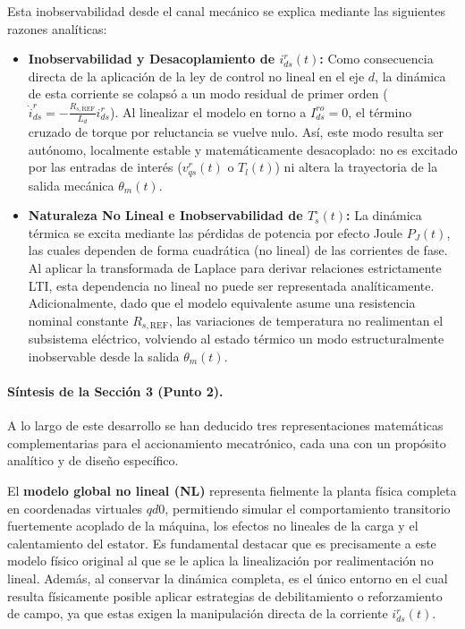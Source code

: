 \documentclass[10pt,a4paper]{article}
\begin{document}
Esta inobservabilidad desde el canal mecánico se explica mediante las siguientes razones analíticas:

\begin{itemize}
    \item \textbf{Inobservabilidad y Desacoplamiento de $i_{ds}^r(t)$:} Como consecuencia directa de la aplicación de la ley de control no lineal en el eje $d$, la dinámica de esta corriente se colapsó a un modo residual de primer orden ($\dot{i}_{ds}^r = -\frac{R_{s,\mathrm{REF}}}{L_d} i_{ds}^r$). Al linealizar el modelo en torno a $I_{ds}^{ro} = 0$, el término cruzado de torque por reluctancia se vuelve nulo. Así, este modo resulta ser autónomo, localmente estable y matemáticamente desacoplado: no es excitado por las entradas de interés ($v_{qs}^r(t)$ o $T_l(t)$) ni altera la trayectoria de la salida mecánica $\theta_m(t)$.
    \item \textbf{Naturaleza No Lineal e Inobservabilidad de $T_s^\circ(t)$:} La dinámica térmica se excita mediante las pérdidas de potencia por efecto Joule $P_J(t)$, las cuales dependen de forma cuadrática (no lineal) de las corrientes de fase. Al aplicar la transformada de Laplace para derivar relaciones estrictamente LTI, esta dependencia no lineal no puede ser representada analíticamente. Adicionalmente, dado que el modelo equivalente asume una resistencia nominal constante $R_{s,\mathrm{REF}}$, las variaciones de temperatura no realimentan el subsistema eléctrico, volviendo al estado térmico un modo estructuralmente inobservable desde la salida $\theta_m(t)$.
\end{itemize}

\paragraph{Síntesis de la Sección 3 (Punto 2).}
A lo largo de este desarrollo se han deducido tres representaciones matemáticas complementarias para el accionamiento mecatrónico, 
cada una con un propósito analítico y de diseño específico.

El \textbf{modelo global no lineal (NL)} representa fielmente la planta física completa en coordenadas virtuales $qd0$, 
permitiendo simular el comportamiento transitorio fuertemente acoplado de la máquina, 
los efectos no lineales de la carga y el calentamiento del estator. 
Es fundamental destacar que es precisamente a este modelo físico original al que se le aplica la linealización por realimentación no lineal. 
Además, al conservar la dinámica completa, es el único entorno en el cual resulta físicamente posible aplicar estrategias de debilitamiento o reforzamiento de campo, 
ya que estas exigen la manipulación directa de la corriente $i_{ds}^{r}(t)$.
\end{document}
